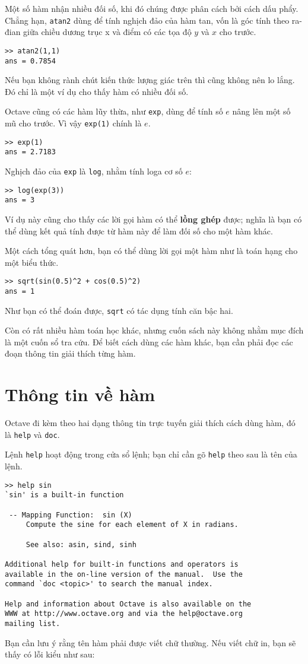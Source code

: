 \documentclass[12pt]{book}
\begin{document}
Một số hàm nhận nhiều đối số, khi đó chúng được phân cách bởi cách
dấu phẩy. Chẳng hạn, {\tt atan2} dùng để tính nghịch đảo của hàm tan,
vốn là góc tính theo ra-đian giữa chiều dương trục x và điểm có các
tọa độ $y$ và $x$ cho trước.

\begin{verbatim}
>> atan2(1,1)
ans = 0.7854
\end{verbatim}
%
Nếu bạn không rành chút kiến thức lượng giác trên thì cũng không nên
lo lắng. Đó chỉ là một ví dụ cho thấy hàm có nhiều đối số.

Octave cũng có các hàm lũy thừa, như {\tt exp}, dùng để tính số
$e$ nâng lên một số mũ cho trước. Vì vậy {\tt exp(1)} chính là $e$.

\begin{verbatim}
>> exp(1)
ans = 2.7183
\end{verbatim}
%
Nghịch đảo của {\tt exp} là {\tt log}, nhằm tính loga cơ số $e$:

\begin{verbatim}
>> log(exp(3))
ans = 3
\end{verbatim}
%
Ví dụ này cũng cho thấy các lời gọi hàm có thể {\bf lồng ghép} được;
nghĩa là bạn có thể dùng kết quả tính được từ hàm này để làm đối số
cho một hàm khác.

Một cách tổng quát hơn, bạn có thể dùng lời gọi một hàm như là toán
hạng cho một biểu thức.

\begin{verbatim}
>> sqrt(sin(0.5)^2 + cos(0.5)^2)
ans = 1
\end{verbatim}
%
Như bạn có thể đoán được, {\tt sqrt} có tác dụng tính căn bậc hai.

Còn có rất nhiều hàm toán học khác, nhưng cuốn sách này không 
nhằm mục đích là một cuốn sổ tra cứu. Để biết cách dùng các hàm
khác, bạn cần phải đọc các đoạn thông tin giải thích từng hàm.


\section{Thông tin về hàm}

Octave đi kèm theo hai dạng thông tin trực tuyến giải thích cách dùng hàm, 
đó là {\tt help} và {\tt doc}.

Lệnh \texttt{help} hoạt động trong cửa sổ lệnh; bạn chỉ cần gõ {\tt help}
theo sau là tên của lệnh.

\begin{verbatim}
>> help sin
`sin' is a built-in function

 -- Mapping Function:  sin (X)
     Compute the sine for each element of X in radians.

     See also: asin, sind, sinh

Additional help for built-in functions and operators is
available in the on-line version of the manual.  Use the 
command `doc <topic>' to search the manual index.

Help and information about Octave is also available on the 
WWW at http://www.octave.org and via the help@octave.org
mailing list.
\end{verbatim}
%
Bạn cần lưu ý rằng tên hàm phải được viết chữ thường. Nếu viết
chữ in, bạn sẽ thấy có lỗi kiểu như sau:
\end{document}
